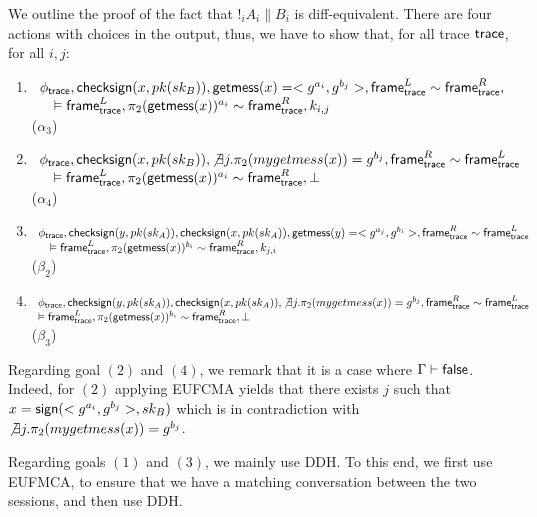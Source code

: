 We outline the proof of the fact that $!_i A_i \| B_i$ is diff-equivalent. There are four actions with choices in the output, thus, we have to show that, for all trace $\textsf{trace}$, for all $i,j$:
\begin{enumerate}
\item $\begin{array}[t]{l}
         \phi_{\textsf{trace}},  \textsf{checksign}(x,pk(sk_B)), \textsf{getmess}(x)=<g^{a_i}, g^{b_j}>, \textsf{frame}_{\textsf{trace}}^L \sim \textsf{frame}_{\textsf{trace}}^R,  \\
         \quad \vDash \textsf{frame}_{\textsf{trace}}^L, \pi_2(\textsf{getmess}(x))^{a_i} \sim \textsf{frame}_{\textsf{trace}}^R, k_{i,j}
\end{array}
         $ ($\alpha_3$)

       \item $\begin{array}[t]{l}
                \phi_{\textsf{trace}},  \textsf{checksign}(x,pk(sk_B)),  \not \exists j. \pi_2(mygetmess(x))= g^{b_j},  \textsf{frame}_{\textsf{trace}}^R \sim \textsf{frame}_{\textsf{trace}}^L \\
                \quad \vDash \textsf{frame}_{\textsf{trace}}^L, \pi_2(\textsf{getmess}(x))^{a_i} \sim \textsf{frame}_{\textsf{trace}}^R, \bot
                \end{array} $ ($\alpha_4$)
              \item $\begin{array}[t]{l}
                       \phi_{\textsf{trace}},  \textsf{checksign}(y,pk(sk_A)), \textsf{checksign}(x,pk(sk_A)), \textsf{getmess}(y)=<g^{a_j}, g^{b_i}>,  \textsf{frame}_{\textsf{trace}}^R \sim \textsf{frame}_{\textsf{trace}}^L \\ \quad \vDash \textsf{frame}_{\textsf{trace}}^L, \pi_2(\textsf{getmess}(x))^{b_i} \sim \textsf{frame}_{\textsf{trace}}^R, k_{j,i}
                     \end{array}$ ($\beta_2$)
              \item $\begin{array}[t]{l}
                       \phi_{\textsf{trace}},  \textsf{checksign}(y,pk(sk_A)), \textsf{checksign}(x,pk(sk_A)),  \not \exists j. \pi_2(mygetmess(x))= g^{b_j},  \textsf{frame}_{\textsf{trace}}^R \sim \textsf{frame}_{\textsf{trace}}^L\\
 \vDash \textsf{frame}_{\textsf{trace}}^L, \pi_2(\textsf{getmess}(x))^{b_i} \sim \textsf{frame}_{\textsf{trace}}^R, \bot
                       \end{array}$ ($\beta_3$)
\end{enumerate}

Regarding goal $(2)$ and $(4)$, we remark that it is a case where $\Gamma \vdash \textsf{false}$. Indeed, for $(2)$ applying EUFCMA yields that there exists $j$ such that $x = \textsf{sign}(<g^{a_i},g^{b_j}>,sk_B)$ which is in contradiction with  $\not \exists j. \pi_2(mygetmess(x))= g^{b_j}$.

Regarding goals $(1)$ and $(3)$, we mainly use DDH. To this end, we first use EUFMCA, to ensure that we have a matching conversation between the two sessions, and then use DDH. 




